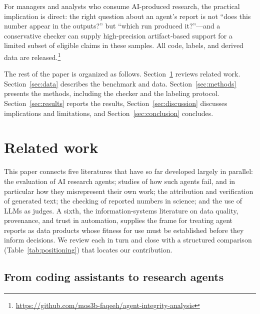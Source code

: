 \documentclass[preprint,12pt,authoryear]{elsarticle}
\newif\ifanon \anonfalse
\begin{document}
For managers and analysts who consume AI-produced research, the practical implication is direct: the right question about an agent's report is not ``does this number appear in the outputs?'' but ``which run produced it?''---and a conservative checker can supply high-precision artifact-based support for a limited subset of eligible claims in these samples. All code, labels, and derived data are released.\ifanon\footnote{Repository link withheld for double-blind review.}\else\footnote{\url{https://github.com/mos3b-faqeeh/agent-integrity-analysis}}\fi

The rest of the paper is organized as follows. Section~\ref{sec:related} reviews related work. Section~\ref{sec:data} describes the benchmark and data. Section~\ref{sec:methods} presents the methods, including the checker and the labeling protocol. Section~\ref{sec:results} reports the results, Section~\ref{sec:discussion} discusses implications and limitations, and Section~\ref{sec:conclusion} concludes.

\section{Related work}\label{sec:related}

This paper connects five literatures that have so far developed largely in parallel: the evaluation of AI research agents; studies of how such agents fail, and in particular how they misrepresent their own work; the attribution and verification of generated text; the checking of reported numbers in science; and the use of LLMs as judges. A sixth, the information-systems literature on data quality, provenance, and trust in automation, supplies the frame for treating agent reports as data products whose fitness for use must be established before they inform decisions. We review each in turn and close with a structured comparison (Table~\ref{tab:positioning}) that locates our contribution.

\subsection{From coding assistants to research agents}\label{sec:rw-agents}
\end{document}
